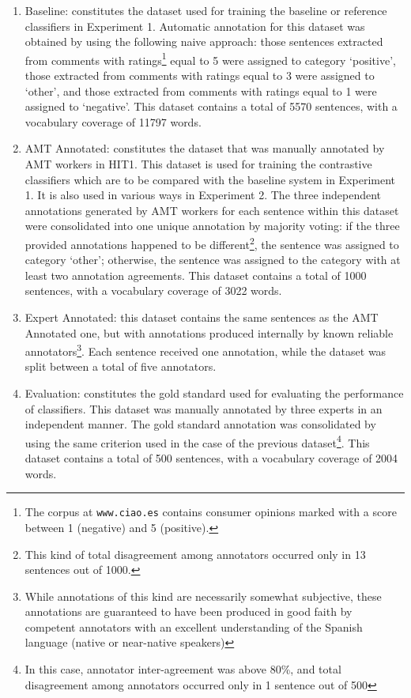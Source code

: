 \documentclass[11pt, a4paper,onecolumn]{article}
\begin{document}
\begin{enumerate}
\item Baseline: constitutes the dataset used for training the baseline or reference classifiers in Experiment 1. 
Automatic annotation for this dataset was obtained by using the following naive approach: those sentences extracted from
comments with ratings\footnote{The corpus at \texttt{www.ciao.es} contains consumer opinions marked with a score between 1 (negative) and 5 (positive).} equal to 5 were assigned to category `positive', those extracted from comments with ratings 
equal to 3 were assigned to `other', and those extracted from comments with ratings equal to 1 were assigned to
`negative'. This dataset contains a total of 5570 sentences, with a vocabulary coverage of 11797 words. 

\item AMT Annotated: constitutes the dataset that was manually annotated by AMT workers in HIT1.
This dataset is used for training the contrastive classifiers which are to be compared with the baseline system in Experiment 1.  It is also used in various ways in Experiment 2. 
The three independent annotations generated by AMT workers for each sentence within this dataset were consolidated into one unique annotation
by majority voting: if the three provided annotations happened to be
different\footnote{This kind of total disagreement among annotators occurred only in 13 sentences out of 1000.}, 
the sentence was assigned to category `other'; otherwise, the sentence was assigned to the category with
at least two annotation agreements. This dataset contains a total of 1000 sentences, with a vocabulary coverage 
of 3022 words. 

\item Expert Annotated: this dataset contains the same sentences as the AMT Annotated one, but with annotations produced internally by known reliable annotators\footnote{While annotations of this kind are necessarily somewhat subjective, these annotations are guaranteed to have been produced in good faith by competent annotators with an excellent understanding of the Spanish language (native or near-native speakers)}.  Each sentence received one annotation, while the dataset was split between a total of five annotators.

\item Evaluation: constitutes the gold standard used for evaluating the performance of classifiers.
This dataset was manually annotated by three experts in an independent manner. The gold standard annotation
was consolidated by using the same criterion used in the case of the previous dataset\footnote{In this case, 
annotator inter-agreement was above 80\%, and total disagreement among annotators occurred only in 1 sentence
out of 500}. This dataset contains a total of 500 sentences, with a vocabulary coverage of 2004 words.    
\end{enumerate} 
\end{document}
